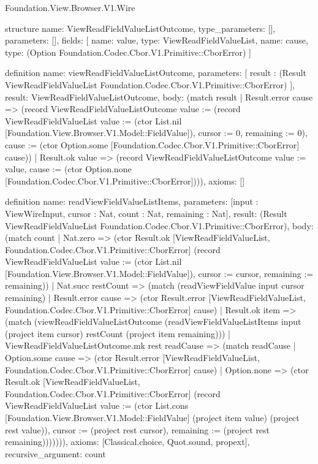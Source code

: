 \begin{lexlean}{Foundation.View.Browser.V1.Wire}
\begin{semanticmodule}
structure{
  name: ViewReadFieldValueListOutcome,
  type_parameters: [],
  parameters: [],
  fields: [
    {name: value, type: ViewReadFieldValueList},
    {name: cause, type: (Option Foundation.Codec.Cbor.V1.Primitive::CborError)}
  ]
}

definition{
  name: viewReadFieldValueListOutcome,
  parameters: [
    result : (Result ViewReadFieldValueList Foundation.Codec.Cbor.V1.Primitive::CborError)
  ],
  result: ViewReadFieldValueListOutcome,
  body: (match result
    | Result.error cause => (record ViewReadFieldValueListOutcome {value := (record ViewReadFieldValueList {value := (ctor List.nil [Foundation.View.Browser.V1.Model::FieldValue]), cursor := 0, remaining := 0}), cause := (ctor Option.some [Foundation.Codec.Cbor.V1.Primitive::CborError] cause)})
    | Result.ok value => (record ViewReadFieldValueListOutcome {value := value, cause := (ctor Option.none [Foundation.Codec.Cbor.V1.Primitive::CborError])})),
  axioms: []
}

definition{
  name: readViewFieldValueListItems,
  parameters: [input : ViewWireInput, cursor : Nat, count : Nat, remaining : Nat],
  result: (Result ViewReadFieldValueList Foundation.Codec.Cbor.V1.Primitive::CborError),
  body: (match count
    | Nat.zero => (ctor Result.ok [ViewReadFieldValueList, Foundation.Codec.Cbor.V1.Primitive::CborError] (record ViewReadFieldValueList {value := (ctor List.nil [Foundation.View.Browser.V1.Model::FieldValue]), cursor := cursor, remaining := remaining}))
    | Nat.succ restCount => (match (readViewFieldValue input cursor remaining)
      | Result.error cause => (ctor Result.error [ViewReadFieldValueList, Foundation.Codec.Cbor.V1.Primitive::CborError] cause)
      | Result.ok item => (match (viewReadFieldValueListOutcome (readViewFieldValueListItems input (project item cursor) restCount (project item remaining)))
        | ViewReadFieldValueListOutcome.mk rest readCause => (match readCause
          | Option.some cause => (ctor Result.error [ViewReadFieldValueList, Foundation.Codec.Cbor.V1.Primitive::CborError] cause)
          | Option.none => (ctor Result.ok [ViewReadFieldValueList, Foundation.Codec.Cbor.V1.Primitive::CborError] (record ViewReadFieldValueList {value := (ctor List.cons [Foundation.View.Browser.V1.Model::FieldValue] (project item value) (project rest value)), cursor := (project rest cursor), remaining := (project rest remaining)})))))),
  axioms: [Classical.choice, Quot.sound, propext],
  recursive_argument: count
}


\end{semanticmodule}
\end{lexlean}
